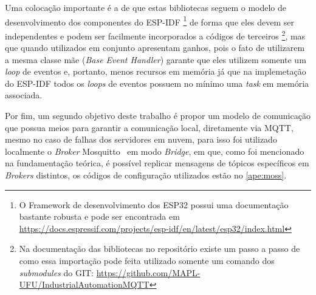 \newpage
Uma colocação importante é a de que estas bibliotecas seguem o modelo de desenvolvimento dos componentes do \ac{ESP-IDF}
\footnote{O Framework de desenvolvimento dos ESP32 possui uma documentação bastante robusta e pode ser encontrada em 
\url{https://docs.espressif.com/projects/esp-idf/en/latest/esp32/index.html}\cite{esp-idf-docs}}
de forma que eles devem ser independentes e podem ser facilmente incorporados a códigos de terceiros
\footnote{Na documentação das bibliotecas no repositório existe um passo a passo de como essa importação pode feita 
utilizado somente um comando dos \textit{submodules} do GIT: \url{https://github.com/MAPL-UFU/IndustrialAutomationMQTT}},
 mas que quando utilizados em conjunto apresentam ganhos, pois o fato de utilizarem a mesma classe mãe (\textit{Base Event Handler}) garante que eles utilizem
 somente um \textit{loop} de eventos e, portanto, menos recursos em memória já que na implemetação do \ac{ESP-IDF} todos 
 os \textit{loops} de eventos possuem no mínimo uma \textit{task} em memória associada. 

Por fim, um segundo objetivo deste trabalho é propor um modelo de comunicação que possua meios para garantir a comunicação
local, diretamente via \ac{MQTT}, mesmo no caso de falhas dos servidores em nuvem, para isso foi utilizado localmente
o \textit{Broker} Mosquitto\textregistered~ em modo \textit{Bridge}, em que, como foi mencionado na fundamentação teórica,
é possível replicar mensagens de tópicos específicos em \textit{Brokers} distintos, os códigos de configuração utilizados 
estão no \autoref{ape:moss}.


